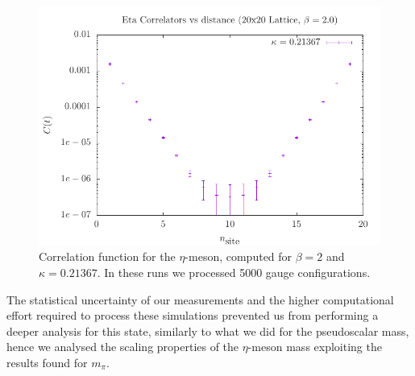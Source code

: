\begin{figure} 
    \centering
    \includegraphics[width = 0.8\linewidth]{images/eta_corr.pdf}
    \caption{Correlation function for the $\eta$-meson, computed for $\beta = 2$ and $\kappa = 0.21367$. In these runs we processed 5000 gauge configurations.}
    \label{fig: eta corr}
\end{figure}
The statistical uncertainty of our measurements and the higher computational effort required to process these simulations prevented us from performing a deeper analysis for this state, similarly to what we did for the pseudoscalar mass, hence we analysed the scaling properties of the $\eta$-meson mass exploiting the results found for $m_\pi$. 

